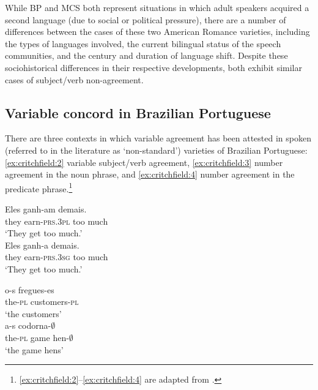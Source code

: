 \documentclass[output=paper,colorlinks,citecolor=brown,
]{langscibook}
\begin{document}
While BP and MCS both represent situations in which adult speakers acquired a second language (due to social or political pressure), there are a number of differences between the cases of these two American Romance varieties, including the types of languages involved, the current bilingual status of the speech communities, and the century and duration of language shift. Despite these sociohistorical differences in their respective developments, both exhibit similar cases of subject/verb non-agreement.

\subsection{Variable concord in Brazilian Portuguese}

There are three contexts in which variable agreement has been attested in spoken (referred to in the literature as `non-standard') varieties of Brazilian Portuguese: \ref{ex:critchfield:2} variable subject/verb agreement, \ref{ex:critchfield:3} number agreement in the noun phrase, and \ref{ex:critchfield:4} number agreement in the predicate phrase.\footnote{\ref{ex:critchfield:2}--\ref{ex:critchfield:4} are adapted from \citet[235]{naro2000variable}.}


\begin{exe} %
    \ex\label{ex:critchfield:2} 
    \begin{xlist} 
        \ex \label{ex:critchfield:2a}
            \gll Eles ganh-am  demais.\\  
                 they earn-\textsc{prs}.\textsc{3pl} {too much}\\
            \glt `They get too much.'\\
        \ex\label{ex:critchfield:2b}
            \gll  Eles ganh-a demais.\\
                  they earn-\textsc{prs}.\textsc{3sg}  {too much}\\
            \glt  `They get too much.'
\end{xlist}
\end{exe}


\begin{exe} %
    \ex\label{ex:critchfield:3} 
    \begin{xlist} 
        \ex \label{ex:critchfield:3a}
            \gll o-s          fregues-es\\  
                 the-\textsc{pl}    customers-\textsc{pl}\\
            \glt `the customers'\\
        \ex\label{ex:critchfield:3b}
            \gll   a-s  {codorna-$\emptyset$}\\
                 the-\textsc{pl}  {game hen-$\emptyset$}\\
            \glt  `the game hens'
\end{xlist}
\end{exe}
\end{document}
